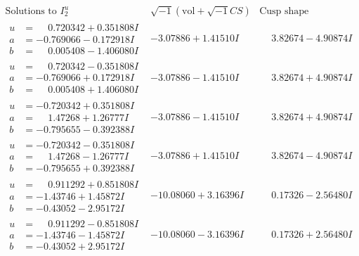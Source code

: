 \documentclass[1p]{elsarticle_modified}
\theoremstyle{definition}
\newcommand{\I}{\sqrt{-1}}
\begin{document}
$$\begin{array}{c|c|c}  
\text{Solutions to }I^u_{2}& \I (\text{vol} + \sqrt{-1}CS) & \text{Cusp shape}\\
 \hline 
\begin{aligned}
u &= \phantom{-}0.720342 + 0.351808 I \\
a &= -0.769066 - 0.172918 I \\
b &= \phantom{-}0.005408 - 1.406080 I\end{aligned}
 & -3.07886 + 1.41510 I & \phantom{-}3.82674 - 4.90874 I \\ \hline\begin{aligned}
u &= \phantom{-}0.720342 - 0.351808 I \\
a &= -0.769066 + 0.172918 I \\
b &= \phantom{-}0.005408 + 1.406080 I\end{aligned}
 & -3.07886 - 1.41510 I & \phantom{-}3.82674 + 4.90874 I \\ \hline\begin{aligned}
u &= -0.720342 + 0.351808 I \\
a &= \phantom{-}1.47268 + 1.26777 I \\
b &= -0.795655 - 0.392388 I\end{aligned}
 & -3.07886 - 1.41510 I & \phantom{-}3.82674 + 4.90874 I \\ \hline\begin{aligned}
u &= -0.720342 - 0.351808 I \\
a &= \phantom{-}1.47268 - 1.26777 I \\
b &= -0.795655 + 0.392388 I\end{aligned}
 & -3.07886 + 1.41510 I & \phantom{-}3.82674 - 4.90874 I \\ \hline\begin{aligned}
u &= \phantom{-}0.911292 + 0.851808 I \\
a &= -1.43746 + 1.45872 I \\
b &= -0.43052 - 2.95172 I\end{aligned}
 & -10.08060 + 3.16396 I & \phantom{-}0.17326 - 2.56480 I \\ \hline\begin{aligned}
u &= \phantom{-}0.911292 - 0.851808 I \\
a &= -1.43746 - 1.45872 I \\
b &= -0.43052 + 2.95172 I\end{aligned}
 & -10.08060 - 3.16396 I & \phantom{-}0.17326 + 2.56480 I \\ \hline\begin{aligned}

\end{aligned}
\end{array}$$
\end{document}
